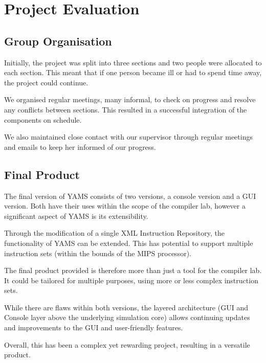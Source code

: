 \section{Project Evaluation}


\subsection{Group Organisation}

Initially, the project was split into three sections and two people were allocated to each section.  This meant that if one person became ill or had to spend time away, the project could continue.

We organised regular meetings, many informal, to check on progress and resolve any conflicts between sections.  This resulted in a successful integration of the components on schedule.

We also maintained close contact with our supervisor through regular meetings and emails to keep her informed of our progress.


\subsection{Final Product}

The final version of YAMS consists of two versions, a console version and a GUI version. Both have their uses within the scope of the compiler lab, however a significant aspect of YAMS is its extensibility.

Through the modification of a single XML Instruction Repository, the functionality of YAMS can be extended. This has potential to support multiple instruction sets (within the bounds of the MIPS processor).

The final product provided is therefore more than just a tool for the compiler lab. It could be tailored for multiple purposes, using more or less complex instruction sets.

While there are flaws within both versions, the layered architecture (GUI and Console layer above the underlying simulation core) allows continuing updates and improvements to the GUI and user-friendly features.

Overall, this has been a complex yet rewarding project, resulting in a versatile product.
 
